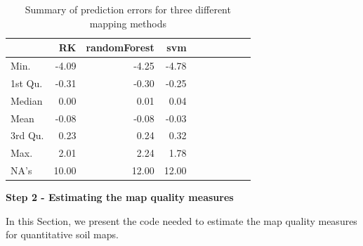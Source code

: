 \documentclass[10pt,b5paper,]{book}
\theoremstyle{definition}
\theoremstyle{definition}
\theoremstyle{definition}
\theoremstyle{remark}
\begin{document}
\begin{table}

\caption{\label{tab:prederrors}Summary of prediction errors for three different mapping methods}
\centering
\begin{tabular}[t]{lrrrrrrrrr}
\toprule
  & RK & randomForest & svm\\
\midrule
Min. & -4.09 & -4.25 & -4.78\\
1st Qu. & -0.31 & -0.30 & -0.25\\
Median & 0.00 & 0.01 & 0.04\\
Mean & -0.08 & -0.08 & -0.03\\
3rd Qu. & 0.23 & 0.24 & 0.32\\
\addlinespace
Max. & 2.01 & 2.24 & 1.78\\
NA's & 10.00 & 12.00 & 12.00\\
\bottomrule
\end{tabular}
\end{table}

\textbf{Step 2 - Estimating the map quality measures}

In this Section, we present the code needed to estimate the map quality
measures for quantitative soil maps.
\end{document}
